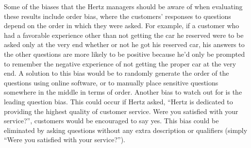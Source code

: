 \documentclass[10pt, oneside,spanish]{article}
\begin{document}
Some of the biases that the Hertz managers should be aware of when evaluating these results include order bias, where the customers’ responses to questions depend on the order in which they were asked.  For example, if a customer who had a favorable experience other than not getting the car he reserved were to be asked only at the very end whether or not he got his reserved car, his answers to the other questions are more likely to be positive because he’d only be prompted to remember the negative experience of not getting the proper car at the very end.  A solution to this bias would be to randomly generate the order of the questions using online software, or to manually place sensitive questions somewhere in the middle in terms of order.  Another bias to watch out for is the leading question bias.  This could occur if Hertz asked, “Hertz is dedicated to providing the highest quality of customer service.  Were you satisfied with your service?”, customers would be encouraged to say yes.  This bias could be eliminated by asking questions without any extra description or qualifiers (simply “Were you satisfied with your service?”). 
\end{document}
